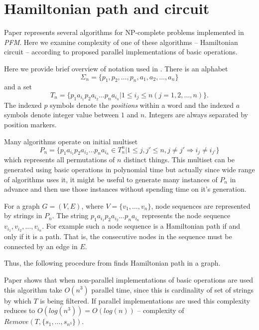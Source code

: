 \section{Hamiltonian path and circuit} \label{algo}

Paper \cite{Katsanyi:2003} represents several algorithms for NP-complete problems implemented in \emph{PFM}. Here we examine complexity of one of these algorithms -- Hamiltonian circuit -- according to proposed parallel implementations of basic operations.

Here we provide brief overview of notation used in \cite{Katsanyi:2003}. There is an alphabet
$$\Sigma_n = \{p_1, p_2, \dots, p_n, a_1, a_2, \dots, a_n\}$$
and a set
$$T_n = \{p_1 a_{i_1} p_2 a_{i_2} \dots p_n a_{i_n} |
1 \leq i_j \leq n (j = 1, 2, \dots, n)\}.$$
The indexed $p$ symbols denote the \emph{positions} within a word and the indexed $a$ symbols denote integer value between $1$ and $n$. Integers are always separated by position markers.

Many algorithms operate on initial multiset 
$$P_n=\{p_1 a_{i_1} p_2 a_{i_2} \dots p_n a_{i_n} \in T^n_n | 
         1 \leq j, j' \leq n, j \neq j' \Rightarrow i_j \neq i_{j'}\}$$ 
which represents all permutations of $n$ distinct things. This multiset can be generated using basic operations in polynomial time \cite{Amos:1996} but actually since wide range of algorithms uses it, it might be useful to generate many instances of $P_n$ in advance and then use those instances without spending time on it's generation.

For a graph $G=(V, E)$, where $V=\{v_1, \dots, v_n\}$, node sequences are represented by strings in $P_n$. The string $p_1 a_{i_1} p_2 a_{i_2} \dots p_n a_{i_n}$ represents the node sequence $v_{i_1}, v_{i_2}, \dots, v_{i_n}$. For example such a node sequence is a Hamiltonian path if and only if it is a path. That is, the consecutive nodes in the sequence must be connected by an edge in $E$.

Thus, the following procedure from \cite{Amos:1996} finds Hamiltonian path in a graph.


Paper \cite{Katsanyi:2003} shows that when non-parallel implementations of basic operations are used this algorithm take $O(n^3)$ parallel time, since this is cardinality of set of strings by which $T$ is being filtered. If parallel implementations are used this complexity reduces to $O(log(n^3))=O(log(n))$ -- complexity of $Remove(T, \{s_1, \dots, s_{n^3}\})$.

